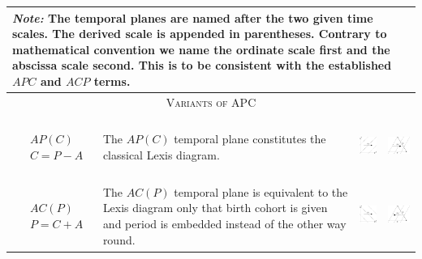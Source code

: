 \documentclass[
  12pt
]{scrartcl}
\begin{document}

\begin{center}
  \small
  \begin{longtable}{m{}m{}m{}m{}}
  \toprule
  \multicolumn{4}{m{0.9\textwidth}}{\footnotesize \emph{Note:} The temporal planes are named after the two given time scales. The derived scale is appended in parentheses. Contrary to mathematical convention we name the ordinate scale first and the abscissa scale second. This is to be consistent with the established $APC$ and $ACP$ terms.} \\
  \midrule
  \multicolumn{4}{c}{\textsc{Variants of APC}} \\
  \midrule
  $$\begin{aligned}
    &AP(C) \\
    &C = P - A
  \end{aligned}$$ &
  The $AP(C)$ temporal plane constitutes the classical Lexis diagram. &
  \includegraphics[height = 2cm]{../fig/APc.pdf} &
  \includegraphics[height = 2cm]{../fig/APc_iso.pdf}  \\
  $$\begin{aligned}
    &AC(P) \\
    &P = C + A
  \end{aligned}$$ &
  The $AC(P)$ temporal plane is equivalent to the Lexis diagram only that birth cohort is given and period is embedded instead of the other way round. &
  \includegraphics[height = 2cm]{../fig/ACp.pdf} &
  \includegraphics[height = 2cm]{../fig/ACp_iso.pdf}  \\

\end{longtable}
\end{center}
\end{document}
